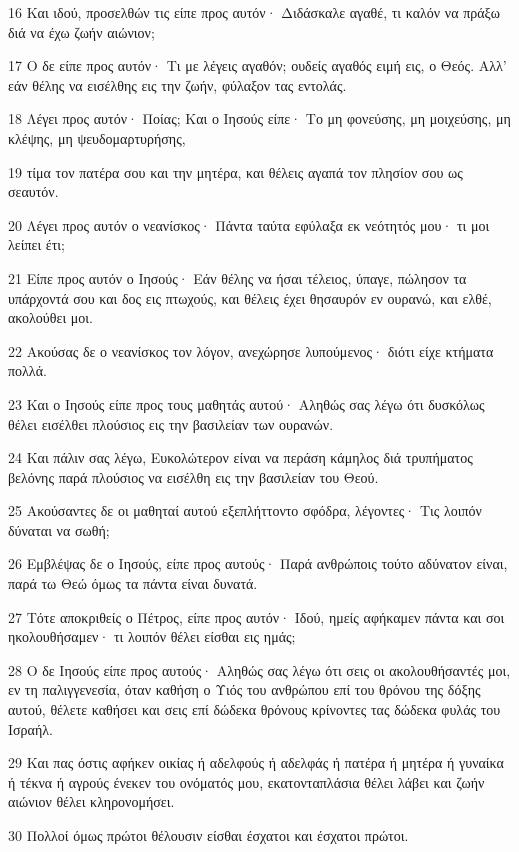 \par 16 Και ιδού, προσελθών τις είπε προς αυτόν· Διδάσκαλε αγαθέ, τι καλόν να πράξω διά να έχω ζωήν αιώνιον;
\par 17 Ο δε είπε προς αυτόν· Τι με λέγεις αγαθόν; ουδείς αγαθός ειμή εις, ο Θεός. Αλλ' εάν θέλης να εισέλθης εις την ζωήν, φύλαξον τας εντολάς.
\par 18 Λέγει προς αυτόν· Ποίας; Και ο Ιησούς είπε· Το μη φονεύσης, μη μοιχεύσης, μη κλέψης, μη ψευδομαρτυρήσης,
\par 19 τίμα τον πατέρα σου και την μητέρα, και θέλεις αγαπά τον πλησίον σου ως σεαυτόν.
\par 20 Λέγει προς αυτόν ο νεανίσκος· Πάντα ταύτα εφύλαξα εκ νεότητός μου· τι μοι λείπει έτι;
\par 21 Είπε προς αυτόν ο Ιησούς· Εάν θέλης να ήσαι τέλειος, ύπαγε, πώλησον τα υπάρχοντά σου και δος εις πτωχούς, και θέλεις έχει θησαυρόν εν ουρανώ, και ελθέ, ακολούθει μοι.
\par 22 Ακούσας δε ο νεανίσκος τον λόγον, ανεχώρησε λυπούμενος· διότι είχε κτήματα πολλά.
\par 23 Και ο Ιησούς είπε προς τους μαθητάς αυτού· Αληθώς σας λέγω ότι δυσκόλως θέλει εισέλθει πλούσιος εις την βασιλείαν των ουρανών.
\par 24 Και πάλιν σας λέγω, Ευκολώτερον είναι να περάση κάμηλος διά τρυπήματος βελόνης παρά πλούσιος να εισέλθη εις την βασιλείαν του Θεού.
\par 25 Ακούσαντες δε οι μαθηταί αυτού εξεπλήττοντο σφόδρα, λέγοντες· Τις λοιπόν δύναται να σωθή;
\par 26 Εμβλέψας δε ο Ιησούς, είπε προς αυτούς· Παρά ανθρώποις τούτο αδύνατον είναι, παρά τω Θεώ όμως τα πάντα είναι δυνατά.
\par 27 Τότε αποκριθείς ο Πέτρος, είπε προς αυτόν· Ιδού, ημείς αφήκαμεν πάντα και σοι ηκολουθήσαμεν· τι λοιπόν θέλει είσθαι εις ημάς;
\par 28 Ο δε Ιησούς είπε προς αυτούς· Αληθώς σας λέγω ότι σεις οι ακολουθήσαντές μοι, εν τη παλιγγενεσία, όταν καθήση ο Υιός του ανθρώπου επί του θρόνου της δόξης αυτού, θέλετε καθήσει και σεις επί δώδεκα θρόνους κρίνοντες τας δώδεκα φυλάς του Ισραήλ.
\par 29 Και πας όστις αφήκεν οικίας ή αδελφούς ή αδελφάς ή πατέρα ή μητέρα ή γυναίκα ή τέκνα ή αγρούς ένεκεν του ονόματός μου, εκατονταπλάσια θέλει λάβει και ζωήν αιώνιον θέλει κληρονομήσει.
\par 30 Πολλοί όμως πρώτοι θέλουσιν είσθαι έσχατοι και έσχατοι πρώτοι.

